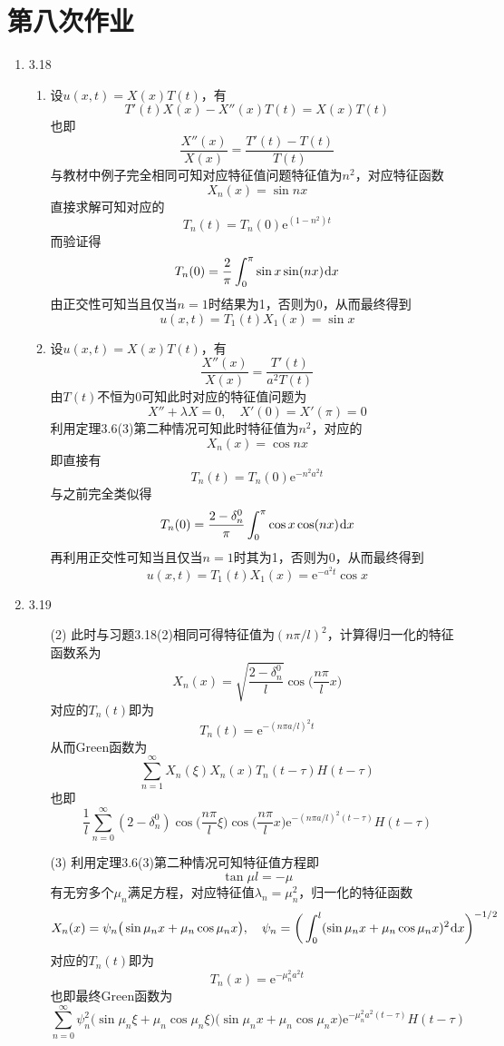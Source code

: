 \documentclass[a4paper,UTF8,fontset=windows,10pt]{ctexart}
\newcommand*{\dr}{\hspace{0.07em}\mathrm{d}}
\newcommand*{\er}{\mathrm{e}}
\begin{document}
\section{第八次作业}
\begin{enumerate}
    \item 3.18
    \begin{enumerate}[(1)]
        \item 设$u(x,t)=X(x)T(t)$，有
        $$T'(t)X(x)-X''(x)T(t)=X(x)T(t)$$
        也即
        $$\frac{X''(x)}{X(x)}=\frac{T'(t)-T(t)}{T(t)}$$
        与教材中例子完全相同可知对应特征值问题特征值为$n^2$，对应特征函数
        $$X_n(x)=\sin nx$$
        直接求解可知对应的
        $$T_n(t)=T_n(0)\er^{(1-n^2)t}$$
        而验证得
        $$T_n(0)=\frac{2}{\pi}\int_0^\pi\sin x\sin(nx)\dr x$$
        由正交性可知当且仅当$n=1$时结果为1，否则为0，从而最终得到
        $$u(x,t)=T_1(t)X_1(x)=\sin x$$
    
        \item 设$u(x,t)=X(x)T(t)$，有
        $$\frac{X''(x)}{X(x)}=\frac{T'(t)}{a^2T(t)}$$
        由$T(t)$不恒为0可知此时对应的特征值问题为
        $$X''+\lambda X=0,\quad X'(0)=X'(\pi)=0$$
        利用定理3.6(3)第二种情况可知此时特征值为$n^2$，对应的
        $$X_n(x)=\cos nx$$
        即直接有
        $$T_n(t)=T_n(0)\er^{-n^2a^2t}$$
        与之前完全类似得
        $$T_n(0)=\frac{2-\delta_n^0}{\pi}\int_0^\pi\cos x\cos(nx)\dr x$$
        再利用正交性可知当且仅当$n=1$时其为1，否则为0，从而最终得到
        $$u(x,t)=T_1(t)X_1(x)=\er^{-a^2t}\cos x$$
    \end{enumerate}
    
    \item 3.19
    \begin{enumerate}
        \item[(2)]
        此时与习题3.18(2)相同可得特征值为$(n\pi/l)^2$，计算得归一化的特征函数系为
        $$X_n(x)=\sqrt{\frac{2-\delta_n^0}{l}}\cos\bigg(\frac{n\pi}{l}x\bigg)$$
        对应的$T_n(t)$即为
        $$T_n(t)=\er^{-(n\pi a/l)^2t}$$
        从而Green函数为
        $$\sum_{n=1}^\infty X_n(\xi)X_n(x)T_n(t-\tau)H(t-\tau)$$
        也即
        $$\frac{1}{l}\sum_{n=0}^\infty(2-\delta_n^0)\cos\bigg(\frac{n\pi}{l}\xi\bigg)\cos\bigg(\frac{n\pi}{l}x\bigg)\er^{-(n\pi a/l)^2(t-\tau)}H(t-\tau)$$
    
        \item[(3)]
        利用定理3.6(3)第二种情况可知特征值方程即
        $$\tan\mu l=-\mu$$
        有无穷多个$\mu_n$满足方程，对应特征值$\lambda_n=\mu_n^2$，归一化的特征函数
        $$X_n(x)=\psi_n\big(\sin\mu_nx+\mu_n\cos\mu_n x\big),\quad\psi_n=\bigg(\int_0^l(\sin\mu_nx+\mu_n\cos\mu_n x)^2\dr x\bigg)^{-1/2}$$
        对应的$T_n(t)$即为
        $$T_n(x)=\er^{-\mu_n^2a^2t}$$
        也即最终Green函数为
        $$\sum_{n=0}^\infty\psi_n^2\big(\sin\mu_n\xi+\mu_n\cos\mu_n\xi\big)\big(\sin\mu_nx+\mu_n\cos\mu_n x\big)\er^{-\mu_n^2a^2(t-\tau)}H(t-\tau)$$
    \end{enumerate}
    

\end{enumerate}
\end{document}
